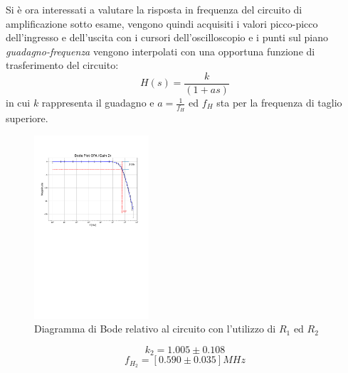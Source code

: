 \documentclass[journal]{IEEEtran}
\begin{document}
Si è ora interessati a valutare la risposta in frequenza del circuito di amplificazione sotto esame, vengono quindi acquisiti i valori picco-picco dell'ingresso e dell'uscita con i cursori dell'oscilloscopio e i punti sul piano \textit{guadagno-frequenza} vengono interpolati con una opportuna funzione di trasferimento del circuito:
\[H(s)=\frac{k}{(1+as)}\] 
in cui $k$ rappresenta il guadagno e $a = \frac{1}{f_H}$ ed $f_H$ sta per la frequenza di taglio superiore.
\begin{figure}[H]%
\begin {center}
\includegraphics[width=0.38\textwidth]{analysis/output/OPA-bode_gain2(mag).pdf}
\caption{Diagramma di Bode relativo al circuito con l'utilizzo di $R_1$ ed $R_2$ }
\label{fig:gain2}
\end {center}
\end{figure}
\[k_2 = 1.005 \pm 0.108\] 
\[f_{H_2} = [ 0.590 \pm 0.035 ]MHz\]
\end{document}
